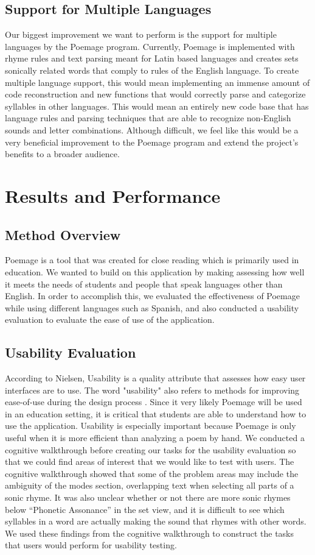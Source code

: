 \documentclass[journal]{vgtc}                %
\begin{document}
\subsection{Support for Multiple Languages}
Our biggest improvement we want to perform is the support for multiple languages by the Poemage program. Currently, Poemage is implemented with rhyme rules and text parsing meant for Latin based languages and creates sets sonically related words that comply to rules of the English language. To create multiple language support, this would mean implementing an immense amount of code reconstruction and new functions that would correctly parse and categorize syllables in other languages. This would mean an entirely new code base that has language rules and parsing techniques that are able to recognize non-English sounds and letter combinations. Although difficult, we feel like this would be a very beneficial improvement to the Poemage program and extend the project’s benefits to a broader audience.

\section{Results and Performance} \label{results}
\subsection{Method Overview}
Poemage is a tool that was created for close reading which is primarily used in education. 
We wanted to build on this application by making assessing how well it meets the needs of students and people that speak languages other than English. 
In order to accomplish this, we evaluated the effectiveness of Poemage while using different languages such as Spanish, and also conducted a usability evaluation to evaluate the ease of use of the application. 
\subsection{Usability Evaluation}
According to Nielsen, Usability is a quality attribute that assesses how easy user interfaces are to use. 
The word "usability" also refers to methods for improving ease-of-use during the design process \cite{nielson}. 
Since it very likely Poemage will be used in an education setting, it is critical that students are able to understand how to use the application. 
Usability is especially important because Poemage is only useful when it is more efficient than analyzing a poem by hand. 
We conducted a cognitive walkthrough before creating our tasks for the usability evaluation so that we could find areas of interest that we would like to test with users. 
\indent The cognitive walkthrough showed that some of the problem areas may include the ambiguity of the modes section, overlapping text when selecting all parts of a sonic rhyme. 
It was also unclear whether or not there are more sonic rhymes below “Phonetic Assonance” in the set view, and it is difficult to see which syllables in a word are actually making the sound that rhymes with other words. 
We used these findings from the cognitive walkthrough to construct the tasks that users would perform for usability testing. 
\end{document}
